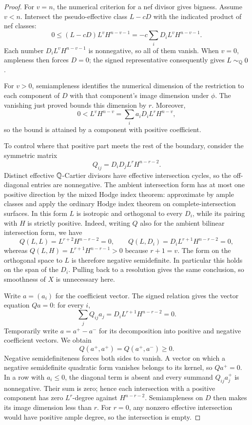 \begin{proof}
For $v=n$, the numerical criterion for a nef divisor gives bigness.
Assume $v<n$.  Intersect the pseudo-effective class $L-cD$ with the
indicated product of nef classes:
\[
 0\le (L-cD)L^vH^{n-v-1}
    =-c\sum_iD_iL^vH^{n-v-1}.
\]
Each number $D_iL^vH^{n-v-1}$ is nonnegative, so all of them vanish.
When $v=0$, ampleness then forces $D=0$; the signed representative
consequently gives $L\sim_{\mathbb{Q}}0$.

For $v>0$, semiampleness identifies the numerical dimension of the
restriction to each component of $D$ with that component's image
dimension under $\phi$.  The vanishing just proved bounds this
dimension by $r$.  Moreover,
\[
 0<L^vH^{n-v}=\sum_i a_iD_iL^rH^{n-v},
\]
so the bound is attained by a component with positive coefficient.

To control where that positive part meets the rest of the boundary,
consider the symmetric matrix
\[
 Q_{ij}=D_iD_jL^rH^{n-r-2}.
\]
Distinct effective $\mathbb{Q}$-Cartier divisors have effective intersection
cycles, so the off-diagonal entries are nonnegative.  The ambient
intersection form has at most one positive direction by the mixed
Hodge index theorem: approximate by ample classes and apply the
ordinary Hodge index theorem on complete-intersection surfaces.
In this form $L$ is isotropic and orthogonal to every $D_i$, while
its pairing with $H$ is strictly positive. Indeed, writing $Q$
also for the ambient bilinear intersection form, we have
\[
 Q(L,L)=L^{r+2}H^{n-r-2}=0,\qquad
 Q(L,D_i)=D_iL^{r+1}H^{n-r-2}=0,
\]
whereas $Q(L,H)=L^{r+1}H^{n-r-1}>0$ because $r+1=v$.
The form on the orthogonal space to $L$ is therefore negative
semidefinite. In particular this holds on the span of the $D_i$.
Pulling back
to a resolution gives the same conclusion, so smoothness of $X$
is unnecessary here.

Write $a=(a_i)$ for the coefficient vector. The signed relation
gives the vector equation $Qa=0$: for every $i$,
\[
 \sum_jQ_{ij}a_j=D_iL^{r+1}H^{n-r-2}=0.
\]
Temporarily write
$a=a^+-a^-$ for its decomposition into positive and negative
coefficient vectors.  We obtain
\[
 Q(a^+,a^+)=Q(a^+,a^-)\ge0.
\]
Negative semidefiniteness forces both sides to vanish. A vector
on which a negative semidefinite quadratic form vanishes belongs
to its kernel, so $Qa^+=0$. In a row with $a_i\le0$, the diagonal
term is absent and every summand $Q_{ij}a_j^+$ is nonnegative.
Their sum is zero; hence each intersection with a positive
component has zero $L^r$-degree against $H^{n-r-2}$. Semiampleness
on $D$ then makes its image dimension less than $r$.  For $r=0$,
any nonzero effective intersection would have positive ample
degree, so the intersection is empty.
\end{proof}

